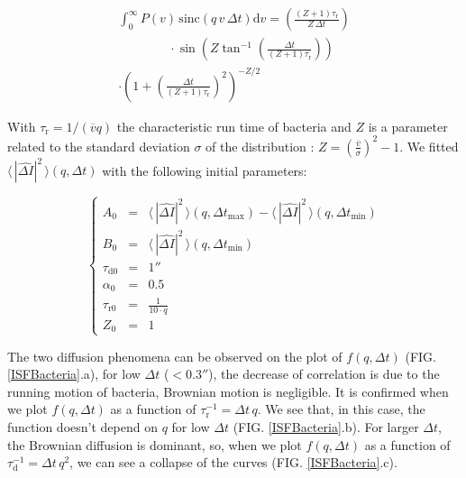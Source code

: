 \documentclass[%
 aip,
 jmp,%
 amsmath,amssymb,
reprint,%
]{revtex4-1}
\begin{document}
\begin{multline}
\int_{0}^{\infty} P(v)\, \text{sinc}(q\, v\, \Delta t) \mathrm{d}v = \left(\frac{(Z+1)\tau_\text{r}}{Z \, \Delta t}\right) \\ \qquad \qquad \cdot \sin\left(Z\tan^{-1}\left(\frac{\Delta t}{(Z+1)\tau_\text{r}}\right)\right)\\
\cdot \left(1+\left(\frac{\Delta t}{(Z+1)\tau_\text{r}}\right)^2\right)^{-Z/2}
\end{multline}

With $\tau_\text{r} = 1/(\overline{v}q)$ the characteristic run time of bacteria and $Z$ is a parameter related to the standard deviation $\sigma$ of the distribution : $Z = \left( \frac{\overline{v}}{\sigma} \right)^2 -1$. We fitted $\langle \, |\widehat{\Delta I}|^2 \, \rangle (q, \Delta t)$ with the following initial parameters:

\begin{equation}
\left\{
\begin{array}{rcl}
A_0 &=& \langle \, |\widehat{\Delta I}|^2 \, \rangle (q,\Delta t_\text{max}) - \langle \, |\widehat{\Delta I}|^2 \, \rangle (q,\Delta t_\text{min}) \\
B_0 &=& \langle \, |\widehat{\Delta I}|^2 \, \rangle (q,\Delta t_\text{min}) \\
\tau_\text{d0} &=& \unit{1}{\second}\\
\alpha_0 &=& 0.5\\
\tau_\text{r0} &=& \frac{1}{10 \cdot q}\\
Z_0 &=& 1
\end{array}
\right.
\end{equation}

The two diffusion phenomena can be observed on the plot of $f(q, \Delta t)$ (FIG. \ref{ISFBacteria}.a), for low $\Delta t$ ($< \unit{0.3}{\second}$), the decrease of correlation is due to the running motion of bacteria, Brownian motion is negligible. It is confirmed when we plot $f(q, \Delta t)$ as a function of $\tau_\text{r}^{-1} = \Delta t \, q$. We see that, in this case, the function doesn't depend on $q$ for low $\Delta t$ (FIG. \ref{ISFBacteria}.b). For larger $\Delta t$, the Brownian diffusion is dominant, so, when we plot $f(q, \Delta t)$ as a function of $\tau_\text{d}^{-1} = \Delta t \, q^2$, we can see a collapse of the curves (FIG. \ref{ISFBacteria}.c).
\end{document}

